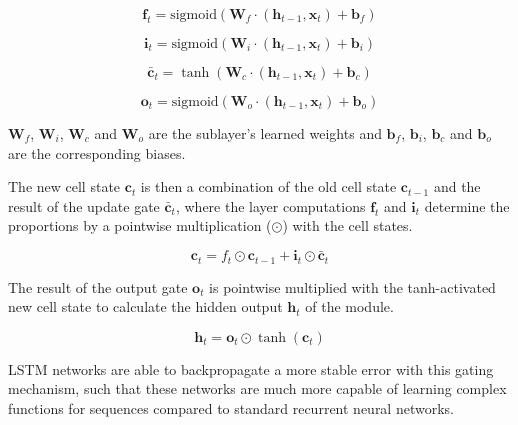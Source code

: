 \begin{equation}
	\bm{f}_t = \text{sigmoid}(\bm{W}_f \cdot (\bm{h}_{t-1}, \bm{x}_t) + \bm{b}_f)
\end{equation}

\begin{equation}
	\bm{i}_t =  \text{sigmoid} (\bm{W}_i \cdot (\bm{h}_{t-1}, \bm{x}_t) + \bm{b}_i)
\end{equation}

\begin{equation}
	\bm{\bar{c}}_t = \tanh (\bm{W}_c \cdot (\bm{h}_{t-1}, \bm{x}_t) + \bm{b}_c)
\end{equation}

\begin{equation}
	\bm{o}_t =  \text{sigmoid} (\bm{W}_o \cdot (\bm{h}_{t-1}, \bm{x}_t) + \bm{b}_o)
\end{equation}

$\bm{W}_f$, $\bm{W}_i$, $\bm{W}_c$ and $\bm{W}_o$ are the sublayer's learned weights and $\bm{b}_f$, $\bm{b}_i$, $\bm{b}_c$ and $\bm{b}_o$ are the corresponding biases.

The new cell state $\bm{c}_t$ is then a combination of the old cell state $\bm{c}_{t-1}$ and the result of the update gate $\bm{\bar{c}}_t$, where the layer computations $\bm{f}_t$ and $\bm{i}_t$ determine the proportions by a pointwise multiplication ($\odot$) with the cell states.

\begin{equation}
	\bm{c}_t = f_t \odot \bm{c}_{t-1} + \bm{i}_t \odot \bm{\bar{c}}_t
\end{equation}

The result of the output gate $\bm{o}_t$ is pointwise multiplied with the tanh-activated new cell state to calculate the hidden output $\bm{h}_t$ of the module.

\begin{equation}
	\bm{h}_t = \bm{o}_t \odot \tanh(\bm{c}_t )
\end{equation}

LSTM networks are able to backpropagate a more stable error with this gating mechanism, such that these networks are much more capable of learning complex functions for sequences compared to standard recurrent neural networks.